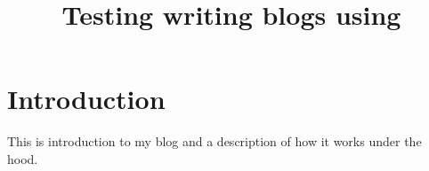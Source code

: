 \documentclass{article}
\title{Testing writing blogs using \latex{}}
\begin{document}
\maketitle
\section{Introduction}
This is introduction to my blog and a description of how it works under the
hood.
\end{document}
